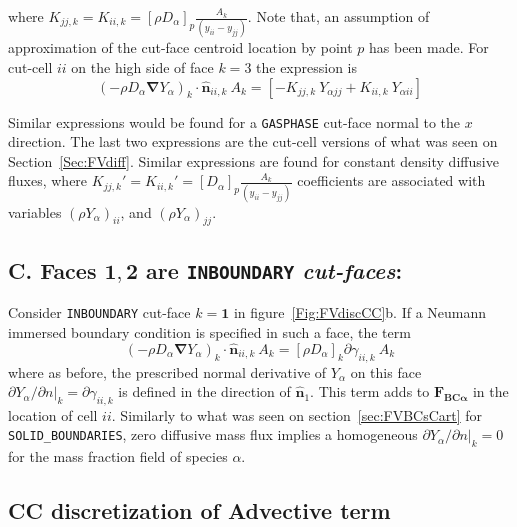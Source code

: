 %
where $K_{jj,k}=K_{ii,k}=[ \rho D_\alpha ]_p \frac{A_k}{(y_{ii}-y_{jj})}$. Note that, an assumption of approximation of the cut-face centroid location by point $p$ has been made. For cut-cell $ii$ on the high side of face $k=3$ the expression is
%
\begin{equation}
  \left( - \rho D_\alpha \boldsymbol{\nabla} Y_\alpha \right)_k \cdot \hat{\mathbf{n}}_{ii,k} \: A_k =
  \left[  -K_{jj,k} \: Y_{\alpha jj} +  K_{ii,k} \: Y_{\alpha ii} \right]
\end{equation}
%

Similar expressions would be found for a \texttt{GASPHASE} cut-face normal to the $x$ direction. The last two expressions are the cut-cell versions of what was seen on Section~\ref{Sec:FVdiff}. Similar expressions are found for constant density diffusive fluxes, where $K_{jj,k}'=K_{ii,k}'=[D_\alpha ]_p \frac{A_k}{(y_{ii}-y_{jj})}$ coefficients are associated with variables $\left( \rho Y_{\alpha} \right)_{ii}$, and $\left( \rho Y_{\alpha} \right)_{jj}$.


\subsection*{C. Faces $\mathbf{1},\mathbf{2}$ are \texttt{INBOUNDARY} \textit{cut-faces}:}

Consider \texttt{INBOUNDARY} cut-face $k=\mathbf{1}$ in figure~\ref{Fig:FVdiscCC}b. If a Neumann immersed boundary condition is specified in such a face, the term
%
\begin{equation}
  \left( - \rho D_\alpha \boldsymbol{\nabla} Y_\alpha \right)_k \cdot \hat{\mathbf{n}}_{ii,k} \: A_k = [\rho D_\alpha]_k \partial \gamma_{ii,k} \: A_k
\end{equation}
%
where as before, the prescribed normal derivative of $Y_\alpha$ on this face $\partial Y_\alpha / \partial n |_k=\partial  \gamma_{ii,k}$ is defined in the direction of $\hat{\mathbf{n}}_1$.
This term adds to $\mathbf{F_{BC \alpha}}$ in the location of cell $ii$. Similarly to what was seen on section~\ref{sec:FVBCsCart} for \texttt{SOLID\_BOUNDARIES}, zero diffusive mass flux implies a homogeneous $\partial Y_\alpha / \partial n |_k=0$ for the mass fraction field of species $\alpha$.




\subsection{CC discretization of Advective term}

